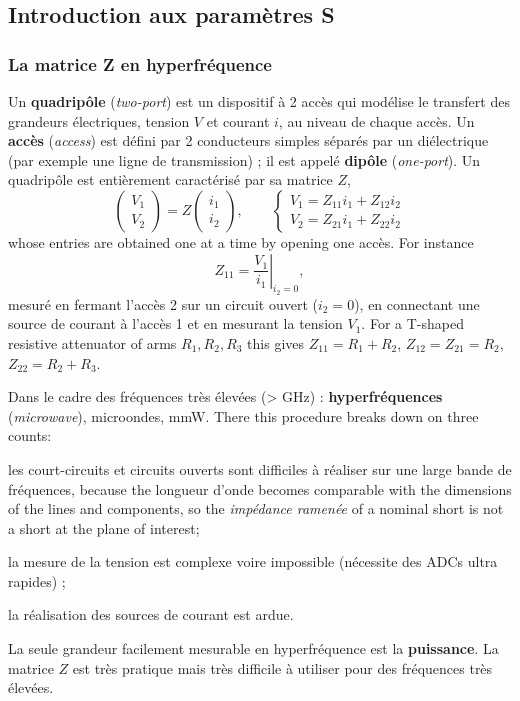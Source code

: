 \subsection{Introduction aux paramètres S}
\subsubsection{La matrice Z en hyperfréquence}
Un \textbf{quadripôle} (\textit{two-port}) est un dispositif à 2 accès qui modélise le
transfert des grandeurs électriques, tension $V$ et courant $i$, au niveau de chaque
accès. Un \textbf{accès} (\textit{access}) est défini par 2 conducteurs simples séparés
par un diélectrique (par exemple une ligne de transmission) ; il est appelé
\textbf{dipôle} (\textit{one-port}). Un quadripôle est entièrement caractérisé par sa
matrice $Z$,
\[\begin{pmatrix} V_1 \\ V_2 \end{pmatrix}
  = Z \begin{pmatrix} i_1 \\ i_2 \end{pmatrix},
  \qquad
  \begin{cases} V_1 = Z_{11} i_1 + Z_{12} i_2 \\ V_2 = Z_{21} i_1 + Z_{22} i_2 \end{cases}\]
whose entries are obtained one at a time by opening one accès. For instance
\[Z_{11} = \left.\frac{V_1}{i_1}\right|_{i_2 = 0},\]
mesuré en fermant l'accès 2 sur un circuit ouvert ($i_2 = 0$), en connectant une
source de courant à l'accès 1 et en mesurant la tension $V_1$. For a T-shaped
resistive attenuator of arms $R_1, R_2, R_3$ this gives $Z_{11} = R_1 + R_2$,
$Z_{12} = Z_{21} = R_2$, $Z_{22} = R_2 + R_3$.

\begin{remark}
  Dans le cadre des fréquences très élevées (> GHz) : \textbf{hyperfréquences}
  (\textit{microwave}), microondes, mmW. There this procedure breaks down on three
  counts:
  \begin{subpart}
    \item les court-circuits et circuits ouverts sont difficiles à réaliser sur une
      large bande de fréquences, because the longueur d'onde becomes comparable with
      the dimensions of the lines and components, so the \textit{impédance ramenée} of
      a nominal short is not a short at the plane of interest;
    \item la mesure de la tension est complexe voire impossible (nécessite des ADCs
      ultra rapides) ;
    \item la réalisation des sources de courant est ardue.
  \end{subpart}
  La seule grandeur facilement mesurable en hyperfréquence est la \textbf{puissance}.
  La matrice $Z$ est très pratique mais très difficile à utiliser pour des fréquences
  très élevées.
\end{remark}

